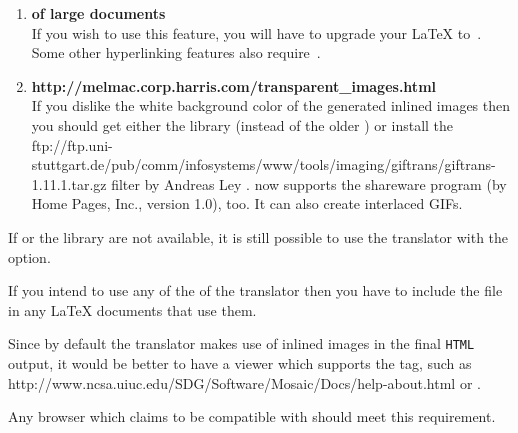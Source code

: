 \begin{enumerate}
%
%
\item
\textbf{ of large documents}\\
If you wish to use this feature, you will have to upgrade your
\LaTeX{} to \LaTeXe\,.
Some other hyperlinking features also require \LaTeXe\,.

%
%
\item
\textbf{%
{http://melmac.corp.harris.com/transparent\_images.html}}\\
If you dislike the white background color of the
generated inlined images then you should get either
the  library (instead of the older )
or install the %
{ftp://ftp.uni-stuttgart.de/pub/comm/infosystems/www/tools/imaging/giftrans/giftrans-1.11.1.tar.gz}
filter by Andreas Ley .
\latextohtml{} now supports the shareware program 
(by Home Pages, Inc., version 1.0), too.
It can also create interlaced GIFs.
%
\end{enumerate}

%

\noindent
If  or the  library are
not available, it is still possible to use the translator with the
 option.

%
%
\html{\\}%

If you intend to use any of the 
of the translator 
then you have to include the  file
in any \LaTeX{}  documents that use them.

%
%
%
%
%
%
\html{\\}%

Since by default the translator makes use of inlined images in the final
\texttt{HTML} output, it would be better to have a viewer
which supports the  tag, such as %
{http://www.ncsa.uiuc.edu/SDG/Software/Mosaic/Docs/help-about.html}
or .
\begin{changebar}
Any browser which claims to be compatible with \HTMLiii{} should meet
this requirement.
\end{changebar}


